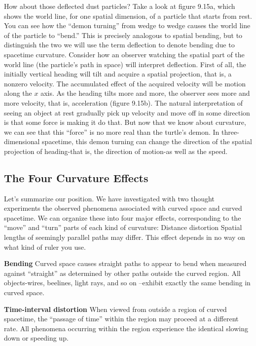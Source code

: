 \documentclass{book}
\begin{document}
How about those deflected dust particles? Take a look at figure 9.15a,
which shows the world line, for one spatial dimension, of a particle that
starts from rest. You can see how the ``demon turning'' from wedge to
wedge causes the world line of the particle to ``bend.'' This is precisely
analogous to spatial bending, but to distinguish the two we will use the
term deflection to denote bending due to spacetime curvature.
Consider how an observer watching the spatial part of the world line
(the particle's path in space) will interpret deflection. First of all, the
initially vertical heading will tilt and acquire a spatial projection, that
is, a nonzero velocity. The accumulated effect of the acquired velocity
will be motion along the $x$ axis. As the heading tilts more and more, the
observer sees more and more velocity, that is, acceleration (figure 9.15b).
The natural interpretation of seeing an object at rest gradually pick up
velocity and move off in some direction is that some force is making it
do that. But now that we know about curvature, we can see that this
``force'' is no more real than the turtle's demon. In three-dimensional
spacetime, this demon turning can change the direction of the spatial
projection of heading-that is, the direction of motion-as well as the
speed.

\subsection{The Four Curvature Effects}

Let's summarize our position. We have investigated with two thought
experiments the observed phenomena associated with curved space and
curved spacetime. We can organize these into four major effects, corresponding to the ``move'' and ``turn'' parts of each kind of curvature:
Distance distortion Spatial lengths of seemingly parallel paths may differ.
This effect depends in no way on what kind of ruler you use.

\noindent \textbf{Bending} Curved space causes straight paths to appear to bend when
measured against ``straight'' as determined by other paths outside the
curved region. All objects-wires, beelines, light rays, and so on --exhibit exactly the same bending in curved space.

\noindent \textbf{Time-interval distortion} When viewed from outside a region of curved
spacetime, the ``passage of time'' within the region may proceed at a
different rate. All phenomena occurring within the region experience
the identical slowing down or speeding up.
\end{document}
